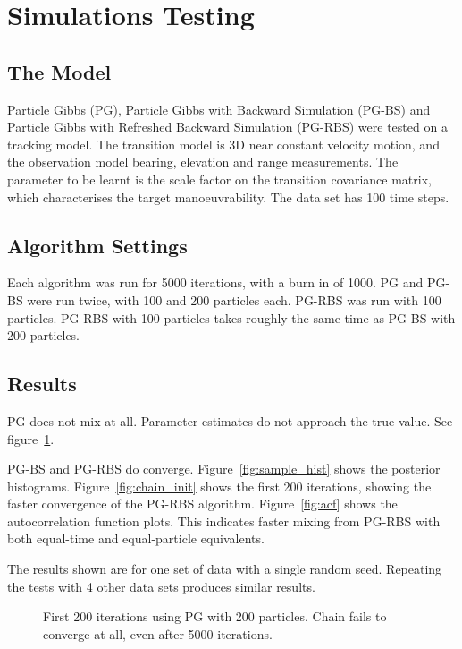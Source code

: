 \documentclass{article}
\begin{document}
\section{Simulations Testing}

\subsection{The Model}
Particle Gibbs (PG), Particle Gibbs with Backward Simulation (PG-BS) and Particle Gibbs with Refreshed Backward Simulation (PG-RBS) were tested on a tracking model. The transition model is 3D near constant velocity motion, and the observation model bearing, elevation and range measurements. The parameter to be learnt is the scale factor on the transition covariance matrix, which characterises the target manoeuvrability. The data set has 100 time steps.

\subsection{Algorithm Settings}
Each algorithm was run for 5000 iterations, with a burn in of 1000. PG and PG-BS were run twice, with 100 and 200 particles each. PG-RBS was run with 100 particles. PG-RBS with 100 particles takes roughly the same time as PG-BS with 200 particles.

\subsection{Results}
PG does not mix at all. Parameter estimates do not approach the true value. See figure~\ref{fig:chain_init_fail}.

PG-BS and PG-RBS do converge. Figure~\ref{fig:sample_hist} shows the posterior histograms. Figure~\ref{fig:chain_init} shows the first 200 iterations, showing the faster convergence of the PG-RBS algorithm. Figure~\ref{fig:acf} shows the autocorrelation function plots. This indicates faster mixing from PG-RBS with both equal-time and equal-particle equivalents.

The results shown are for one set of data with a single random seed. Repeating the tests with 4 other data sets produces similar results.

\begin{figure}
\centering

\caption{First 200 iterations using PG with 200 particles. Chain fails to converge at all, even after 5000 iterations.}
\label{fig:chain_init_fail}
\end{figure}
\end{document}
